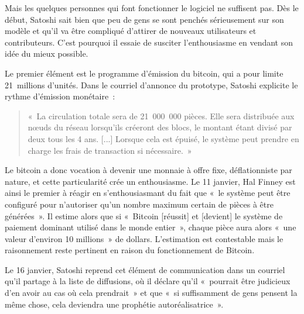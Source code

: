 

Mais les quelques personnes qui font fonctionner le logiciel ne suffisent pas. Dès le début, Satoshi sait bien que peu de gens se sont penchés sérieusement sur son modèle et qu'il va être compliqué d'attirer de nouveaux utilisateurs et contributeurs. C'est pourquoi il essaie de susciter l'enthousiasme en vendant son idée du mieux possible.


Le premier élément est le programme d'émission du bitcoin, qui a pour limite 21~millions d'unités. Dans le courriel d'annonce du prototype, Satoshi explicite le rythme d'émission monétaire~:

\begin{quote}
«~La circulation totale sera de 21~000~000 pièces. Elle sera distribuée aux nœuds du réseau lorsqu'ils créeront des blocs, le montant étant divisé par deux tous les 4 ans. [...] Lorsque cela est épuisé, le système peut prendre en charge les frais de transaction si nécessaire.~»
\end{quote}

Le bitcoin a donc vocation à devenir une monnaie à offre fixe, déflationniste par nature, et cette particularité crée un enthousiasme. Le 11 janvier, Hal Finney est ainsi le premier à réagir en s'enthousiasmant du fait que «~le système peut être configuré pour n'autoriser qu'un nombre maximum certain de pièces à être générées~». Il estime alors que si «~Bitcoin [réussit] et [devient] le système de paiement dominant utilisé dans le monde entier~», chaque pièce aura alors «~une valeur d'environ 10 millions~» de dollars. L'estimation est contestable mais le raisonnement reste pertinent en raison du fonctionnement de Bitcoin. 

Le 16 janvier, Satoshi reprend cet élément de communication dans un courriel qu'il partage à la liste de diffusions, où il déclare qu'il «~pourrait être judicieux d'en avoir au cas où cela prendrait~» et que «~si suffisamment de gens pensent la même chose, cela deviendra une prophétie autoréalisatrice~».

